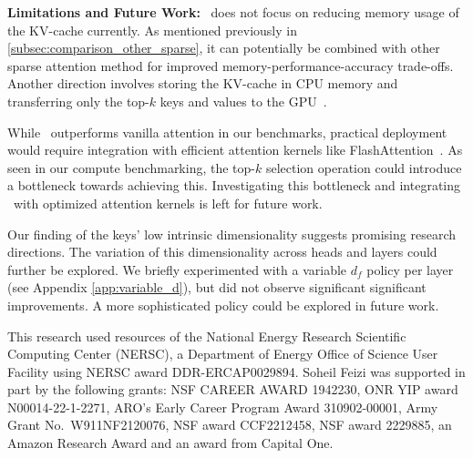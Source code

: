 \vspace{0.08in}
\noindent \textbf{Limitations and Future Work:} 
\method~does not focus on reducing memory usage of the KV-cache currently. As
mentioned previously in \ref{subsec:comparison_other_sparse}, it can potentially
be combined with other sparse attention method for improved
memory-performance-accuracy trade-offs. Another direction involves storing the
KV-cache in CPU memory and transferring only the top-$k$ keys and values to the
GPU~\citep{lee2024infinigen}.

While \method~outperforms vanilla attention in our benchmarks, practical
deployment would require integration with efficient attention kernels like
FlashAttention~\citep{dao2022flashattention}. As seen in our compute
benchmarking, the top-$k$ selection operation could introduce a bottleneck
towards achieving this.  Investigating this bottleneck and integrating
\method~with optimized attention kernels is left for future work.

Our finding of the keys’ low intrinsic dimensionality suggests promising
research directions. The variation of this dimensionality across heads and
layers could further be explored. We briefly experimented with a variable $d_f$
policy per layer (see Appendix \ref{app:variable_d}), but did not observe
significant significant improvements. A more sophisticated policy could be
explored in future work.

\begin{ack}
This research used resources of the National Energy Research Scientific
Computing Center (NERSC), a Department of Energy Office of Science User
Facility using NERSC award DDR-ERCAP0029894. Soheil Feizi was supported in
part by the following grants: NSF CAREER AWARD 1942230, ONR YIP award
N00014-22-1-2271, ARO’s Early Career Program Award 310902-00001, Army Grant
No.~W911NF2120076, NSF award CCF2212458, NSF award 2229885, an Amazon Research
Award and an award from Capital One.

\end{ack}

\clearpage

